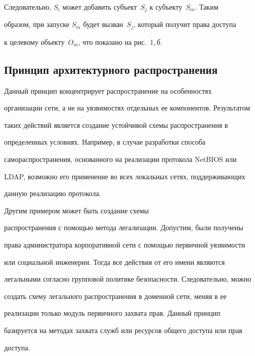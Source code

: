 Следовательно, $S_i$ может добавить субъект~$S_j$ к субъекту~$S_m$. Таким 


образом, при запуске $S_m$ будет вызван~$S_j$, который получит права доступа 


к целевому объекту~$O_m$, что показано на рис.~1,\,\textit{б}. 


     


\subsection{Принцип архитектурного распространения} %


     


     Данный принцип концентрирует распространение на особенностях 


организации сети, а не на уязвимостях отдельных ее компонентов. Результатом 


таких действий является создание устойчивой схемы распространения в 


определенных условиях. Например, в случае разработки способа 


самораспространения, основанного на реализации протокола NetBIOS или 


LDAP, возможно его применение во всех локальных сетях, поддерживающих 


данную реализацию протокола. 





Другим примером может быть создание схемы 


распространения с помощью метода легализации. Допустим, были получены 


права администратора корпоративной сети с помощью первичной уязвимости 


или социальной инженерии. Тогда все действия от его имени являются 


легальными согласно групповой политике без\-опас\-ности. Следовательно, можно 


создать схему легального распространения в доменной сети, меняя в ее 


реализации только модуль первичного захвата прав. Данный принцип 


базируется на методах захвата служб или ресурсов общего доступа или прав 


доступа.


     


